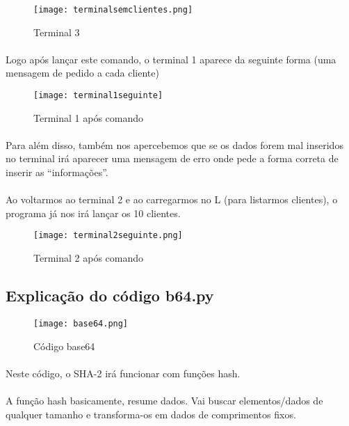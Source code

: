 \documentclass[a4paper,11pt,onecolumn,oneside]{article}
\begin{document}
\begin{figure} [h]
\center
\texttt{[image: terminalsemclientes.png]}
\caption{Terminal 3}
\label{terminal3}
\end{figure}

\newpage
\paragraph{ }
Logo após lançar este comando, o terminal 1 aparece da seguinte forma (uma mensagem de pedido a cada cliente)


\begin{figure} [h]
\center
\texttt{[image: terminal1seguinte]}
\caption{Terminal 1 após comando}
\label{terminal1seguinte}
\end{figure}


\paragraph{ }
Para além disso, também nos apercebemos que se os dados forem mal inseridos no terminal irá aparecer uma mensagem de erro onde pede a forma correta de inserir as “informações”.

\paragraph{ }
Ao voltarmos ao terminal 2 e ao carregarmos no L (para listarmos clientes), o programa já nos irá lançar os 10 clientes.

\begin{figure} [h]
\center
\texttt{[image: terminal2seguinte.png]}
\caption{Terminal 2 após comando}
\label{terminal2seguinte}
\end{figure}

\newpage
\subsection{Explicação do código b64.py}

\begin{figure} [h]
\center
\texttt{[image: base64.png]}
\caption{Código base64}
\label{base64}
\end{figure}

\paragraph{ }
Neste código, o SHA-2 irá funcionar com funções hash.
\paragraph{ }
A função hash basicamente, resume dados. Vai buscar elementos/dados de qualquer tamanho e transforma-os em dados de comprimentos fixos.
\end{document}
